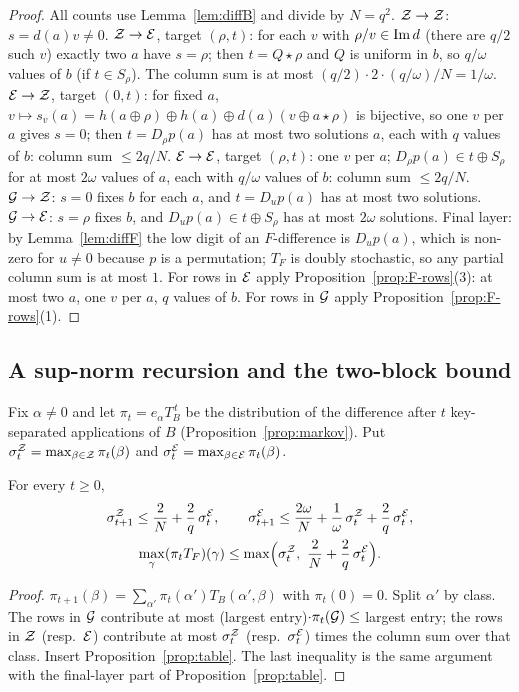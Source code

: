 \begin{proof}
All counts use Lemma~\ref{lem:diffB} and divide by $N=q^2$.
$\mathcal{Z}\to\mathcal{Z}$: $s=d(a)v\ne0$.
$\mathcal{Z}\to\mathcal{E}$, target $(\rho,t)$: for each $v$ with $\rho/v\in\mathrm{Im}\, d$ (there are $q/2$ such $v$) exactly two
$a$ have $s=\rho$; then $t=Q\star\rho$ and $Q$ is uniform in $b$, so $q/\omega$ values of $b$ (if $t\in S_\rho$).
The column sum is at most $(q/2)\cdot2\cdot(q/\omega)/N=1/\omega$.
$\mathcal{E}\to\mathcal{Z}$, target $(0,t)$: for fixed $a$, $v\mapsto s_v(a)=h(a\oplus\rho)\oplus h(a)\oplus d(a)(v\oplus a\star\rho)$ is
bijective, so one $v$ per $a$ gives $s=0$; then $t=D_\rho p(a)$ has at most two solutions $a$, each with
$q$ values of $b$: column sum $\le 2q/N$.
$\mathcal{E}\to\mathcal{E}$, target $(\rho,t)$: one $v$ per $a$; $D_\rho p(a)\in t\oplus S_\rho$ for at most $2\omega$ values of $a$,
each with $q/\omega$ values of $b$: column sum $\le2q/N$.
$\mathcal{G}\to\mathcal{Z}$: $s=0$ fixes $b$ for each $a$, and $t=D_up(a)$ has at most two solutions.
$\mathcal{G}\to\mathcal{E}$: $s=\rho$ fixes $b$, and $D_up(a)\in t\oplus S_\rho$ has at most $2\omega$ solutions.
Final layer: by Lemma~\ref{lem:diffF} the low digit of an $F$-difference is $D_up(a)$, which is non-zero
for $u\ne0$ because $p$ is a permutation; $T_F$ is doubly stochastic, so any partial column sum is at most
$1$. For rows in $\mathcal{E}$ apply Proposition~\ref{prop:F-rows}(3): at most two $a$, one $v$ per $a$, $q$ values
of $b$. For rows in $\mathcal{G}$ apply Proposition~\ref{prop:F-rows}(1).
\end{proof}

\subsection{A sup-norm recursion and the two-block bound}
Fix $\alpha\ne0$ and let $\pi_t=e_\alpha T_B^{\,t}$ be the distribution of the difference after $t$
key-separated applications of $B$ (Proposition~\ref{prop:markov}). Put
$\sigma^{\mathcal{Z}}_t=\max_{\beta\in\mathcal{Z}}\pi_t(\beta)$ and $\sigma^{\mathcal{E}}_t=\max_{\beta\in\mathcal{E}}\pi_t(\beta)$.

\begin{theorem}\label{thm:S}
For every $t\ge0$,
\begin{gather*}
\sigma^{\cZ}_{t+1}\le\frac2N+\frac2q\,\sigma^{\cE}_t,\qquad
\sigma^{\cE}_{t+1}\le\frac{2\omega}N+\frac1\omega\,\sigma^{\cZ}_t+\frac2q\,\sigma^{\cE}_t,\\
\max_\gamma(\pi_tT_F)(\gamma)\le\max\Bigl(\sigma^{\cZ}_t,\ \frac2N+\frac2q\,\sigma^{\cE}_t\Bigr).
\end{gather*}
\end{theorem}
\begin{proof}
$\pi_{t+1}(\beta)=\sum_{\alpha'}\pi_t(\alpha')T_B(\alpha',\beta)$ with $\pi_t(0)=0$. Split $\alpha'$ by class. The rows in
$\mathcal{G}$ contribute at most (largest entry)$\cdot\pi_t(\mathcal{G})\le$ largest entry; the rows in $\mathcal{Z}$ (resp.\ $\mathcal{E}$)
contribute at most $\sigma^{\mathcal{Z}}_t$ (resp.\ $\sigma^{\mathcal{E}}_t$) times the column sum over that class. Insert
Proposition~\ref{prop:table}. The last inequality is the same argument with the final-layer part of
Proposition~\ref{prop:table}.
\end{proof}

